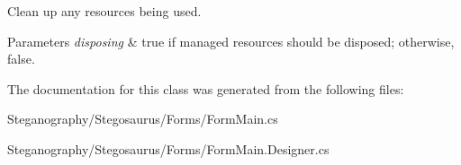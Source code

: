 Clean up any resources being used. 


\begin{DoxyParams}{Parameters}
{\em disposing} & true if managed resources should be disposed; otherwise, false.\\
\hline
\end{DoxyParams}


The documentation for this class was generated from the following files\+:\begin{DoxyCompactItemize}
\item 
Steganography/\+Stegosaurus/\+Forms/Form\+Main.\+cs\item 
Steganography/\+Stegosaurus/\+Forms/Form\+Main.\+Designer.\+cs\end{DoxyCompactItemize}
